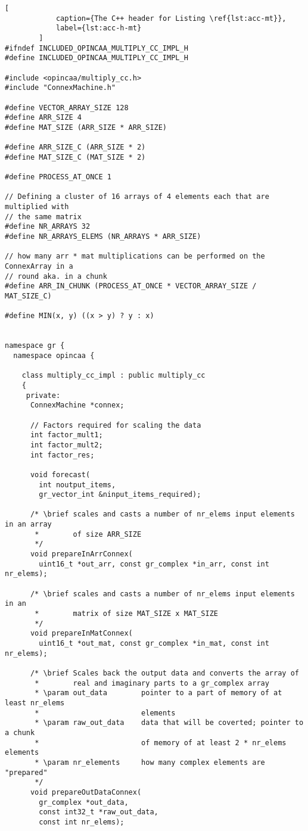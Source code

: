 		\begin{lstlisting}[
		    caption={The C++ header for Listing \ref{lst:acc-mt}},
		    label={lst:acc-h-mt}
		]
#ifndef INCLUDED_OPINCAA_MULTIPLY_CC_IMPL_H
#define INCLUDED_OPINCAA_MULTIPLY_CC_IMPL_H

#include <opincaa/multiply_cc.h>
#include "ConnexMachine.h"

#define VECTOR_ARRAY_SIZE 128
#define ARR_SIZE 4
#define MAT_SIZE (ARR_SIZE * ARR_SIZE)

#define ARR_SIZE_C (ARR_SIZE * 2)
#define MAT_SIZE_C (MAT_SIZE * 2)

#define PROCESS_AT_ONCE 1

// Defining a cluster of 16 arrays of 4 elements each that are multiplied with
// the same matrix
#define NR_ARRAYS 32
#define NR_ARRAYS_ELEMS (NR_ARRAYS * ARR_SIZE)

// how many arr * mat multiplications can be performed on the ConnexArray in a
// round aka. in a chunk
#define ARR_IN_CHUNK (PROCESS_AT_ONCE * VECTOR_ARRAY_SIZE / MAT_SIZE_C)

#define MIN(x, y) ((x > y) ? y : x)


namespace gr {
  namespace opincaa {

    class multiply_cc_impl : public multiply_cc
    {
     private:
      ConnexMachine *connex;

      // Factors required for scaling the data
      int factor_mult1;
      int factor_mult2;
      int factor_res;

      void forecast(
        int noutput_items,
        gr_vector_int &ninput_items_required);

      /* \brief scales and casts a number of nr_elems input elements in an array
       *        of size ARR_SIZE
       */
      void prepareInArrConnex(
        uint16_t *out_arr, const gr_complex *in_arr, const int nr_elems);

      /* \brief scales and casts a number of nr_elems input elements in an
       *        matrix of size MAT_SIZE x MAT_SIZE
       */
      void prepareInMatConnex(
        uint16_t *out_mat, const gr_complex *in_mat, const int nr_elems);

      /* \brief Scales back the output data and converts the array of
       *        real and imaginary parts to a gr_complex array
       * \param out_data        pointer to a part of memory of at least nr_elems
       *                        elements
       * \param raw_out_data    data that will be coverted; pointer to a chunk
       *                        of memory of at least 2 * nr_elems elements
       * \param nr_elements     how many complex elements are "prepared"
       */
      void prepareOutDataConnex(
        gr_complex *out_data,
        const int32_t *raw_out_data,
        const int nr_elems);


\end{lstlisting}

